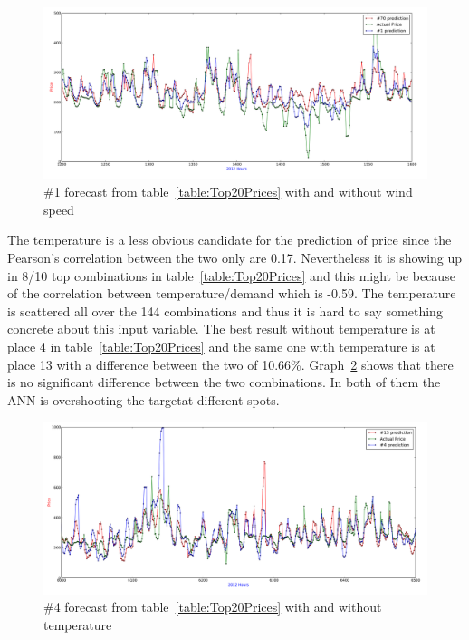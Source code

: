 \begin{figure}[H]
\centering
\includegraphics[width=0.85\linewidth,natwidth=898,natheight=587]{billeder/PriceExperimentalAnalysis/X1_windspeed_vs_no_windspeed.png}
\caption{\#1 forecast from table~\ref{table:Top20Prices} with and without wind speed}
\label{fig:Windspeed_no_windspeed}
\end{figure}

The temperature is a less obvious candidate for the prediction of price since the Pearson's correlation between the two only are 0.17. Nevertheless it is showing up in 8/10 top combinations in table~\ref{table:Top20Prices} and this might be because of the correlation between temperature/demand which is -0.59. The temperature is scattered all over the 144 combinations and thus it is hard to say something concrete about this input variable. The best result without temperature is at place 4 in table~\ref{table:Top20Prices} and the same one with temperature is at place 13 with a difference between the two of 10.66\%. Graph~\ref{fig:temperature_comparison} shows that there is no significant difference between the two combinations. In both of them the ANN is overshooting the targetat different spots.

\begin{figure}[H]
\centering
\includegraphics[width=0.85\linewidth,natwidth=898,natheight=587]{billeder/PriceExperimentalAnalysis/temperatureComparison.png}
\caption{\#4 forecast from table~\ref{table:Top20Prices} with and without temperature}
\label{fig:temperature_comparison}
\end{figure}

